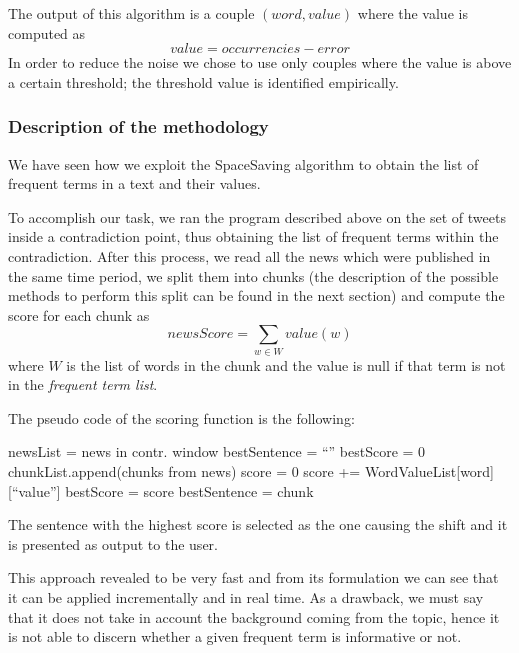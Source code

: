 The output of this algorithm is a couple $(word, value)$ where the value is
computed as 
\begin{displaymath}
	value = occurrencies - error
\end{displaymath}
In order to reduce the noise we chose to use only couples where the value is
above a certain threshold; the threshold value is identified empirically.

\subsubsection*{Description of the methodology}
We have seen how we exploit the SpaceSaving algorithm to obtain the list of
frequent terms in a text and their values. 

To accomplish our task, we ran the program described above on the set of tweets inside a
contradiction point, thus obtaining the list of frequent terms within the
contradiction. After this process, we read all the news which were published in the same time
period, we split them into chunks (the description of the possible methods to
perform this split can be found in the next section) and compute the score for
each chunk as
\begin{displaymath}
	newsScore = \sum_{w \in W} value(w)
\end{displaymath}
where $W$ is the list of words in the chunk and the value is null if that term is
not in the \emph{frequent term list}.

The pseudo code of the scoring function is the following:
\begin{algorithmic}
\STATE newsList = news in contr. window
\STATE bestSentence = ``''
\STATE bestScore = 0
	\STATE chunkList.append(chunks from news)
\ENDFOR
{}
	\STATE score = 0
			\STATE score += WordValueList[word][``value'']
		\ELSE {}
			\STATE bestScore = score
			\STATE bestSentence = chunk
		\ENDIF \ENDIF
	\ENDFOR
\ENDFOR
\end{algorithmic}
The sentence with the highest score is selected as the one causing the shift and
it is presented as output to the user.

This approach revealed to be very fast and from its formulation we can see that
it can be applied incrementally and in real time. As a drawback, we must say that it does not
take in account the background coming from the topic, hence it is not able to
discern whether a given frequent term is informative or not.

